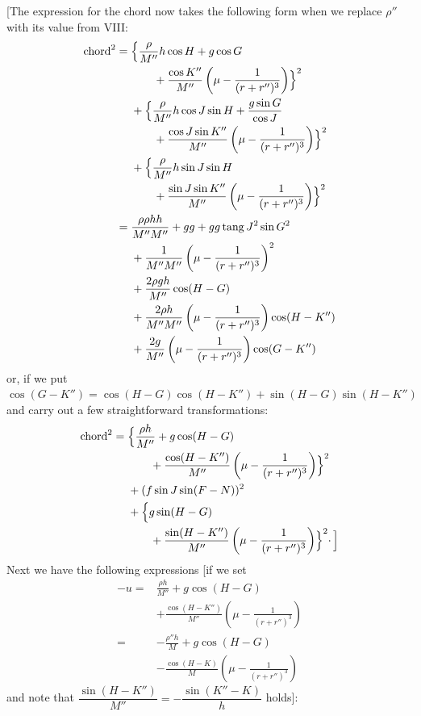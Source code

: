 [The expression for the chord now takes the following form when we replace \(\rho''\) with its value from VIII:
\[
\begin{aligned}
\text{chord}^2={}&\Bigl\{\frac{\rho}{M''}h\cos H+g\cos G\\
&\qquad{}+\frac{\cos K''}{M''}\left(\mu-\frac{1}{(r+r'')^3}\right)\Bigr\}^2\\
&+\Bigl\{\frac{\rho}{M''}h\cos J\sin H+\frac{g\sin G}{\cos J}\\
&\qquad{}+\frac{\cos J\sin K''}{M''}\left(\mu-\frac{1}{(r+r'')^3}\right)\Bigr\}^2\\
&+\Bigl\{\frac{\rho}{M''}h\sin J\sin H\\
&\qquad{}+\frac{\sin J\sin K''}{M''}\left(\mu-\frac{1}{(r+r'')^3}\right)\Bigr\}^2\\
={}&\frac{\rho\rho hh}{M''M''}+gg+gg\operatorname{tang}J^2\sin G^2\\
&+\frac{1}{M''M''}\left(\mu-\frac{1}{(r+r'')^3}\right)^2\\
&+\frac{2\rho gh}{M''}\cos(H-G)\\
&+\frac{2\rho h}{M''M''}\left(\mu-\frac{1}{(r+r'')^3}\right)\cos(H-K'')\\
&+\frac{2g}{M''}\left(\mu-\frac{1}{(r+r'')^3}\right)\cos(G-K'')
\end{aligned}
\]
or, if we put \(\cos(G-K'')=\cos(H-G)\cos(H-K'')+\sin(H-G)\sin(H-K'')\) and carry out a few straightforward transformations:
\[
\begin{aligned}
\text{chord}^2={}&\Bigl\{\frac{\rho h}{M''}+g\cos(H-G)\\
&\qquad{}+\frac{\cos(H-K'')}{M''}\left(\mu-\frac{1}{(r+r'')^3}\right)\Bigr\}^2\\
&+(f\sin J\sin(F-N))^2\\
&+\Bigl\{g\sin(H-G)\\
&\qquad{}+\frac{\sin(H-K'')}{M''}\left(\mu-\frac{1}{(r+r'')^3}\right)\Bigr\}^2\mathpunct{\cdot}\Bigr]
\end{aligned}
\]
Next we have the following expressions [if we set
\[
\begin{aligned}
-u={}&\frac{\rho h}{M''}+g\cos(H-G)\\
&+\frac{\cos(H-K'')}{M''}\left(\mu-\frac{1}{(r+r'')^3}\right)\\
={}&-\frac{\rho''h}{M}+g\cos(H-G)\\
&-\frac{\cos(H-K)}{M}\left(\mu-\frac{1}{(r+r'')^3}\right)
\end{aligned}
\]
and note that \(\dfrac{\sin(H-K'')}{M''}=-\dfrac{\sin(K''-K)}{h}\) holds]:
